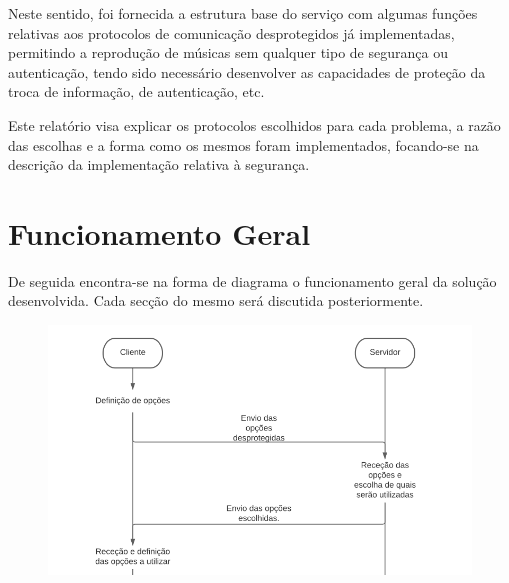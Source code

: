 \documentclass[10pt,english]{article}
\begin{document}
\par Neste sentido, foi fornecida a estrutura base do serviço com algumas funções relativas aos protocolos de comunicação desprotegidos já implementadas, permitindo a reprodução de músicas sem qualquer tipo de segurança ou autenticação, tendo sido necessário desenvolver as capacidades de proteção da troca de informação, de autenticação, etc.

\par Este relatório visa explicar os protocolos escolhidos para cada problema, a razão das escolhas e a forma como os mesmos foram implementados, focando-se na descrição da implementação relativa à segurança.
\clearpage

\section{Funcionamento Geral}

\par De seguida encontra-se na forma de diagrama o funcionamento geral da solução desenvolvida. Cada secção do mesmo será discutida posteriormente.

\begin{figure}[!h]
        \centering
        \includegraphics[width=\textwidth]{images/1.png}
\end{figure}
\end{document}
